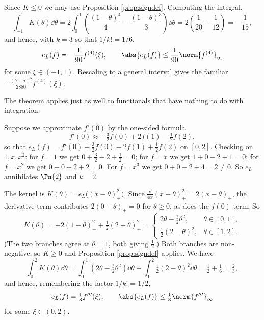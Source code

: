 \begin{center}
\end{center}

Since $K \le 0$ we may use Proposition \ref{prop:signdef}. Computing the integral,
$$
\int_{-1}^{1}K(\theta)\dd\theta = 2\int_0^1\left(\frac{(1-\theta)^4}{4} - \frac{(1-\theta)^3}{3}\right)\dd\theta = 2\left(\frac{1}{20} - \frac{1}{12}\right) = -\frac{1}{15},
$$
and hence, with $k = 3$ so that $1/k! = 1/6$,
$$
e_L(f) = -\frac{1}{90}f^{(4)}(\xi), \qquad \abs{e_L(f)} \leq \frac{1}{90}\norm{f^{(4)}}_\infty
$$
for some $\xi \in (-1,1)$. Rescaling to a general interval gives the familiar $-\frac{(b-a)^5}{2880}f^{(4)}(\xi)$.

The theorem applies just as well to functionals that have nothing to do with integration.

\begin{example}
  Suppose we approximate $f'(0)$ by the one-sided formula
  $$
  f'(0) \approx -\tfrac32 f(0) + 2f(1) - \tfrac12 f(2),
  $$
  so that $e_L(f) = f'(0) + \tfrac32 f(0) - 2f(1) + \tfrac12 f(2)$ on $[0,2]$. Checking on $1, x, x^2$: for $f = 1$ we get $0 + \tfrac32 - 2 + \tfrac12 = 0$; for $f = x$ we get $1 + 0 - 2 + 1 = 0$; for $f = x^2$ we get $0 + 0 - 2 + 2 = 0$. For $f = x^3$ we get $0 + 0 - 2 + 4 = 2 \neq 0$. So $e_L$ annihilates $\Pn{2}$ and $k = 2$.

  The kernel is $K(\theta) = e_L\big((x-\theta)_+^2\big)$. Since $\tfrac{\dd}{\dd x}(x-\theta)_+^2 = 2(x-\theta)_+$, the derivative term contributes $2(0-\theta)_+ = 0$ for $\theta \ge 0$, as does the $f(0)$ term. So
  $$
  K(\theta) = -2(1-\theta)_+^2 + \tfrac12(2-\theta)_+^2 = \begin{cases} 2\theta - \tfrac32\theta^2, & \theta \in [0,1],\\[1ex] \tfrac12(2-\theta)^2, & \theta \in [1,2].\end{cases}
  $$
  (The two branches agree at $\theta = 1$, both giving $\tfrac12$.) Both branches are non-negative, so $K \geq 0$ and Proposition \ref{prop:signdef} applies. We have
  $$
  \int_0^2 K(\theta)\dd\theta = \int_0^1\left(2\theta - \tfrac32\theta^2\right)\dd\theta + \int_1^2 \tfrac12(2-\theta)^2\dd\theta = \tfrac12 + \tfrac16 = \tfrac23,
  $$
  and hence, remembering the factor $1/k! = 1/2$,
  $$
  e_L(f) = \tfrac13 f'''(\xi), \qquad \abs{e_L(f)} \leq \tfrac13\norm{f'''}_\infty
  $$
  for some $\xi \in (0,2)$.
\end{example}

